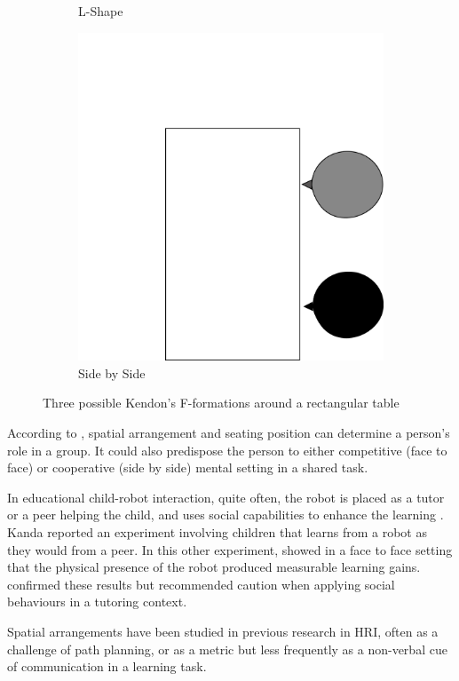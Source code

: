 \documentclass[letterpaper, 10 pt, conference]{ieeeconf}  %
\begin{document}
\begin{figure}
\begin{subfigure}{0.2\textwidth}
		\caption{L-Shape}
		\label{fig:lshape}
	\end{subfigure}
	\begin{subfigure}{0.2\textwidth}
		\centering
		\includegraphics[width=0.8\linewidth]{./figures/fformationss.png}
		\caption{Side by Side }
		\label{fig:sidebside}
	\end{subfigure}
	\caption{Three possible Kendon's F-formations around a rectangular table}
	\label{fig:fformations}
\end{figure}

According to \cite{knapp2013nonverbal}, spatial arrangement and seating position can determine a person's role in a group.
It could also predispose the person to either competitive (face to face) or cooperative (side by side) mental setting in a shared task.



In educational child-robot interaction, quite often, the robot is placed as a tutor or a peer helping the child, and uses social capabilities to enhance the learning \cite{Saerbeck2010}.
Kanda \cite{Kanda2004} reported an experiment involving children that learns from a robot as they would from a peer.
In this other experiment,
\cite{Leyzberg2014} showed in a face to face setting that the physical presence of the robot produced measurable learning gains.
\cite{Kennedy2015} confirmed these results but recommended caution when applying social behaviours in a tutoring context. 


Spatial arrangements have been studied in previous research\cite{Kuzuoka,huttenrauch2006investigating,vazquez2014spatial} in HRI, often as a challenge of path planning, or as a metric but less frequently as a non-verbal cue of communication in a learning task.
\end{document}
